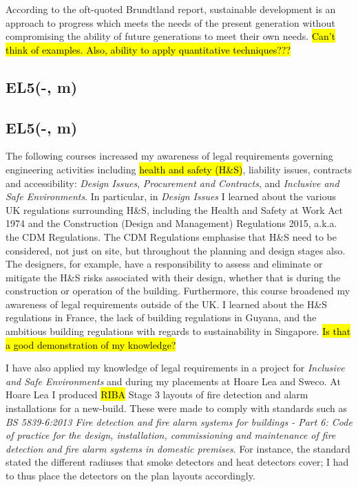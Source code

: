 According to the oft-quoted Brundtland report, sustainable development is an approach to progress which meets the needs of the present generation without compromising the ability of future generations to meet their own needs.
\hl{Can't think of examples. Also, ability to apply quantitative techniques???}


\subsection*{EL5(-, m)}













\subsection*{EL5(-, m)}

The following courses increased my awareness of legal requirements governing engineering activities including \hl{health and safety (H\&S)}, liability issues, contracts and accessibility:
\textit{Design Issues},
\textit{Procurement and Contracts},
and \textit{Inclusive and Safe Environments}.
In particular, in \textit{Design Issues} I learned about the various UK regulations surrounding H\&S, including the Health and Safety at Work Act 1974 and the Construction (Design and Management) Regulations 2015, a.k.a. the CDM Regulations.
The CDM Regulations emphasise that H\&S need to be considered, not just on site, but throughout the planning and design stages also.
The designers, for example, have a responsibility to assess and eliminate or mitigate the H\&S risks associated with their design, whether that is during the construction or operation of the building.
Furthermore, this course broadened my awareness of legal requirements outside of the UK.
I learned about the H\&S regulations in France, the lack of building regulations in Guyana, and the ambitious building regulations with regards to sustainability in Singapore.
\hl{Is that a good demonstration of my knowledge?}

I have also applied my knowledge of legal requirements in a project for \textit{Inclusive and Safe Environments} and during my placements at Hoare Lea and Sweco.
At Hoare Lea I produced \hl{RIBA} Stage 3 layouts of fire detection and alarm installations for a new-build.
These were made to comply with standards such as \textit{BS 5839-6:2013 Fire detection and fire alarm systems for buildings - Part 6: Code of practice for the design, installation, commissioning and maintenance of fire detection and fire alarm systems in domestic premises}.
For instance, the standard stated the different radiuses that smoke detectors and heat detectors cover; I had to thus place the detectors on the plan layouts accordingly.



